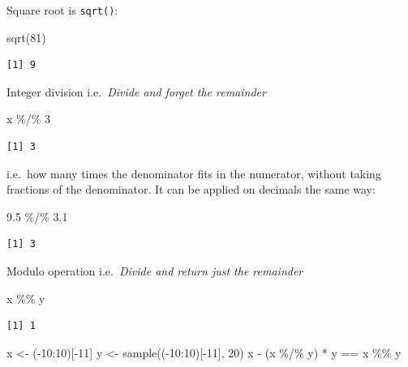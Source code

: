 \documentclass[
]{book}
\newenvironment{Shaded}{\begin{snugshade}}{\end{snugshade}}
\newcommand{\DecValTok}[1]{\textcolor[rgb]{0.00,0.00,0.81}{#1}}
\newcommand{\FloatTok}[1]{\textcolor[rgb]{0.00,0.00,0.81}{#1}}
\newcommand{\FunctionTok}[1]{\textcolor[rgb]{0.00,0.00,0.00}{#1}}
\newcommand{\NormalTok}[1]{#1}
\newcommand{\OtherTok}[1]{\textcolor[rgb]{0.56,0.35,0.01}{#1}}
\newcommand{\SpecialCharTok}[1]{\textcolor[rgb]{0.00,0.00,0.00}{#1}}
\begin{document}
Square root is \texttt{sqrt()}:

\begin{Shaded}
\begin{Highlighting}[]
\FunctionTok{sqrt}\NormalTok{(}\DecValTok{81}\NormalTok{)}
\end{Highlighting}
\end{Shaded}

\begin{verbatim}
[1] 9
\end{verbatim}

Integer division
i.e.~\emph{Divide and forget the remainder}

\begin{Shaded}
\begin{Highlighting}[]
\NormalTok{x }\SpecialCharTok{\%/\%} \DecValTok{3}
\end{Highlighting}
\end{Shaded}

\begin{verbatim}
[1] 3
\end{verbatim}

i.e.~how many times the denominator fits in the numerator, without taking fractions of the denominator. It can be applied on decimals the same way:

\begin{Shaded}
\begin{Highlighting}[]
\FloatTok{9.5} \SpecialCharTok{\%/\%} \FloatTok{3.1}
\end{Highlighting}
\end{Shaded}

\begin{verbatim}
[1] 3
\end{verbatim}

Modulo operation
i.e.~\emph{Divide and return just the remainder}

\begin{Shaded}
\begin{Highlighting}[]
\NormalTok{x }\SpecialCharTok{\%\%}\NormalTok{ y}
\end{Highlighting}
\end{Shaded}

\begin{verbatim}
[1] 1
\end{verbatim}

\begin{Shaded}
\begin{Highlighting}[]
\NormalTok{x }\OtherTok{\textless{}{-}}\NormalTok{ (}\SpecialCharTok{{-}}\DecValTok{10}\SpecialCharTok{:}\DecValTok{10}\NormalTok{)[}\SpecialCharTok{{-}}\DecValTok{11}\NormalTok{]}
\NormalTok{y }\OtherTok{\textless{}{-}} \FunctionTok{sample}\NormalTok{((}\SpecialCharTok{{-}}\DecValTok{10}\SpecialCharTok{:}\DecValTok{10}\NormalTok{)[}\SpecialCharTok{{-}}\DecValTok{11}\NormalTok{], }\DecValTok{20}\NormalTok{)}
\NormalTok{x }\SpecialCharTok{{-}}\NormalTok{ (x }\SpecialCharTok{\%/\%}\NormalTok{ y) }\SpecialCharTok{*}\NormalTok{ y }\SpecialCharTok{==}\NormalTok{ x }\SpecialCharTok{\%\%}\NormalTok{ y}
\end{Highlighting}
\end{Shaded}
\end{document}
